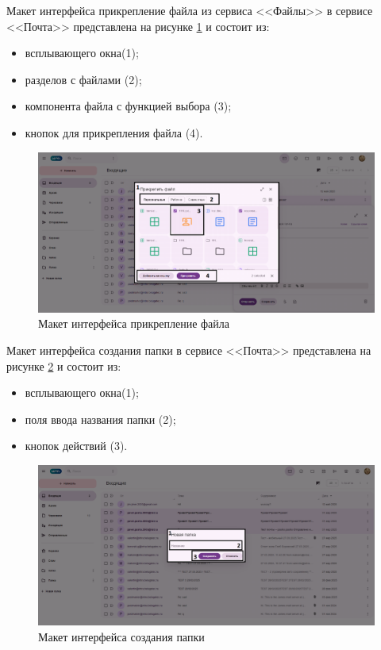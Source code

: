 Макет интерфейса прикрепление файла из сервиса <<Файлы>> в сервисе <<Почта>> представлена на рисунке \ref{templ:image1c} и состоит из:
\begin{itemize}
  \item всплывающего окна(1);
  \item разделов с файлами (2);
  \item компонента файла с функцией выбора (3);
  \item кнопок для прикрепления файла (4).
\end{itemize}
\begin{figure}[H]
	\centering
	\includegraphics[width=1\linewidth]{images/почта3}
	\caption{Макет интерфейса прикрепление файла}
	\label{templ:image1c}
\end{figure}

Макет интерфейса создания папки в сервисе <<Почта>> представлена на рисунке \ref{templ:image1d} и состоит из:
\begin{itemize}
  \item всплывающего окна(1);
  \item поля ввода названия папки (2);
  \item кнопок действий (3).
\end{itemize}
\begin{figure}[H]
	\centering
	\includegraphics[width=1\linewidth]{images/почта4}
	\caption{Макет интерфейса создания папки}
	\label{templ:image1d}
\end{figure}

